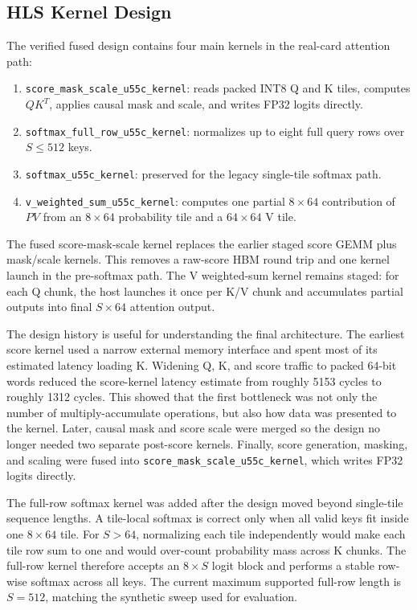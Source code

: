 \documentclass[conference]{IMSTemplate}
\begin{document}
\subsection{HLS Kernel Design}

The verified fused design contains four main kernels in the real-card attention
path:
\begin{enumerate}
    \item \texttt{score\_mask\_scale\_u55c\_kernel}: reads packed INT8 Q and K
    tiles, computes \(QK^T\), applies causal mask and scale, and writes FP32
    logits directly.
    \item \texttt{softmax\_full\_row\_u55c\_kernel}: normalizes up to eight
    full query rows over \(S \leq 512\) keys.
    \item \texttt{softmax\_u55c\_kernel}: preserved for the legacy single-tile
    softmax path.
    \item \texttt{v\_weighted\_sum\_u55c\_kernel}: computes one partial
    \(8\times64\) contribution of \(PV\) from an \(8\times64\) probability tile
    and a \(64\times64\) V tile.
\end{enumerate}

The fused score-mask-scale kernel replaces the earlier staged score GEMM plus
mask/scale kernels. This removes a raw-score HBM round trip and one kernel
launch in the pre-softmax path. The V weighted-sum kernel remains staged:
for each Q chunk, the host launches it once per K/V chunk and accumulates
partial outputs into final \(S\times64\) attention output.

The design history is useful for understanding the final architecture. The
earliest score kernel used a narrow external memory interface and spent most of
its estimated latency loading K. Widening Q, K, and score traffic to packed
64-bit words reduced the score-kernel latency estimate from roughly 5153 cycles
to roughly 1312 cycles. This showed that the first bottleneck was not only the
number of multiply-accumulate operations, but also how data was presented to the
kernel. Later, causal mask and score scale were merged so the design no longer
needed two separate post-score kernels. Finally, score generation, masking, and
scaling were fused into \texttt{score\_mask\_scale\_u55c\_kernel}, which writes
FP32 logits directly.

The full-row softmax kernel was added after the design moved beyond
single-tile sequence lengths. A tile-local softmax is correct only when all
valid keys fit inside one \(8\times64\) tile. For \(S>64\), normalizing each
tile independently would make each tile row sum to one and would over-count
probability mass across K chunks. The full-row kernel therefore accepts an
\(8\times S\) logit block and performs a stable row-wise softmax across all
keys. The current maximum supported full-row length is \(S=512\), matching the
synthetic sweep used for evaluation.
\end{document}
